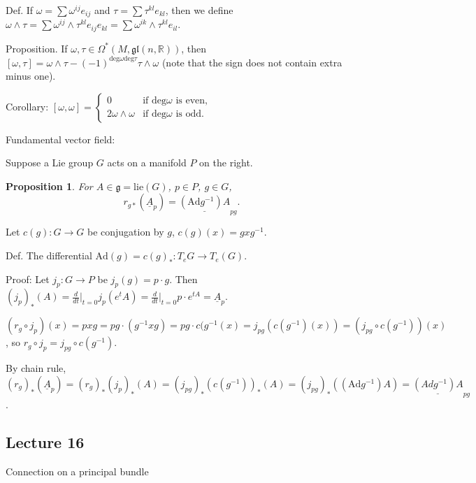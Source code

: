 \documentclass{article}
\theoremstyle{mystyle}
\newtheorem*{proposition*}{Proposition}
\theoremstyle{remark}
\numberwithin{equation}{section}
\begin{document}
Def. If $\omega = \sum \omega^{ij} e_{ij}$ and $\tau = \sum \tau^{kl} e_{kl}$, then we define $\omega \wedge \tau = \sum \omega^{ij}\wedge \tau^{kl} e_{ij}e_{kl}=
\sum \omega^{ik}\wedge \tau^{kl}e_{il}$. 






Proposition. If $\omega,\tau \in \Omega^*(M,\mathfrak{gl}(n,\mathbb{R}))$, then $[\omega,\tau] = \omega \wedge \tau - (-1)^{\text{deg}\omega \text{deg}\tau} \tau \wedge \omega$ (note that the sign does not contain extra minus one).

Corollary: $[\omega,\omega]  = \left\{\begin{array}{ll} 0 & \text{if deg}\omega\text{ is even,}\\
2\omega \wedge \omega &\text{if deg}\omega \text{ is odd}.\end{array}\right.$ 

Fundamental vector field:

Suppose a Lie group $G$ acts on a manifold $P$ on the right. 

\begin{proposition*}
For $A\in \mathfrak{g}=\mathrm{lie}(G)$, $p\in P$, $g\in G$, 
$$r_{g*}(\underline{A}_p) = \underline{(\mathrm{Ad}g^{-1})A}_{pg}.$$
\end{proposition*}

Let $c(g)\colon G\rightarrow G$ be conjugation by $g$, $c(g)(x) = gxg^{-1}$.

Def. The differential $\mathrm{Ad}(g) = c(g)_*\colon T_eG\rightarrow T_e(G)$.

Proof: Let $j_p\colon G\rightarrow P$ be $j_p(g) = p\cdot g$. Then $(j_p)_*(A) = \frac{d}{dt}\Big|_{t=0}j_p(e^tA) = \frac{d}{dt}\Big|_{t=0}p\cdot e^{tA} = \underline{A}_p$. 

$(r_g\circ j_p)(x) = px g = pg\cdot (g^{-1}xg) = pg\cdot c(g^{-1}(x) = j_{pg}(c(g^{-1})(x))
= \left(j_{pg}\circ c(g^{-1})\right)(x)$, so $r_g\circ j_p = j_{pg}\circ c(g^{-1})$. 

By chain rule, $(r_g)_*(\underline{A}_p) = (r_g)_*(j_p)_*(A) = (j_{pg})_*(c(g^{-1}))_* (A) = (j_{pg})_*((\mathrm{Ad}g^{-1})A)
=\underline{(Adg^{-1})A}_{pg}$. 




\subsection{Lecture 16}

Connection on a principal bundle
\end{document}
